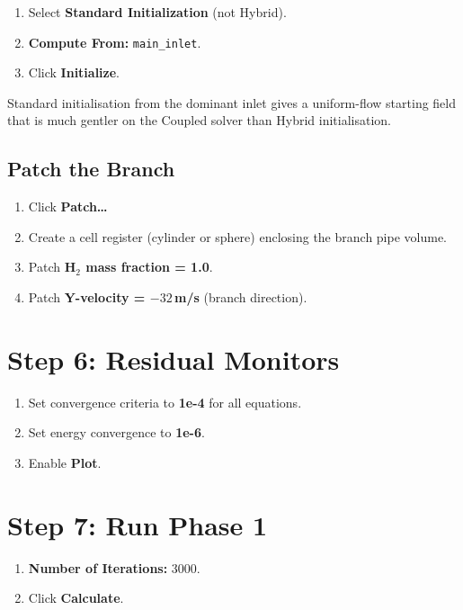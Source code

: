 \documentclass[12pt,a4paper]{report}
\begin{document}
\begin{enumerate}
  \item Select \textbf{Standard Initialization} (not Hybrid).
  \item \textbf{Compute From:} \texttt{main\_inlet}.
  \item Click \textbf{Initialize}.
\end{enumerate}

\noindent Standard initialisation from the dominant inlet gives a
uniform-flow starting field that is much gentler on the Coupled solver
than Hybrid initialisation.

\subsection{Patch the Branch}

\begin{enumerate}
  \item Click \textbf{Patch\ldots}
  \item Create a cell register (cylinder or sphere) enclosing the
        branch pipe volume.
  \item Patch \textbf{H$_2$ mass fraction = 1.0}.
  \item Patch \textbf{Y-velocity = $-32$\,m/s} (branch direction).
\end{enumerate}


\section{Step 6: Residual Monitors}

\begin{enumerate}
  \item Set convergence criteria to \textbf{1e-4} for all equations.
  \item Set energy convergence to \textbf{1e-6}.
  \item Enable \textbf{Plot}.
\end{enumerate}


\section{Step 7: Run Phase 1}

\begin{enumerate}
  \item \textbf{Number of Iterations:} 3000.
  \item Click \textbf{Calculate}.
\end{enumerate}
\end{document}
